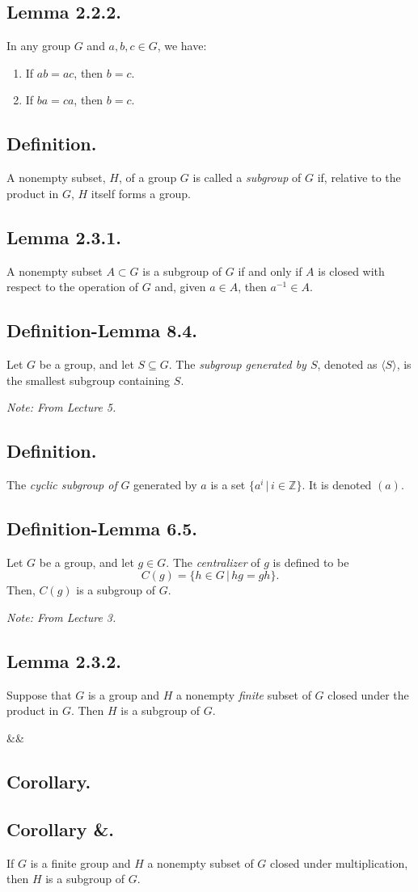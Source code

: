 \documentclass{article}
\newenvironment{lemma}[1]{\subsection*{Lemma #1.}}{}
\newenvironment{defn}{\subsection*{Definition.}}{}
\newenvironment{defnlemma}[1]{\subsection*{Definition-Lemma #1.}}{}
\newenvironment{corollary}[1]{
    \def\temp{#1}\def\null{&}\ifx\temp\null
        \subsection*{Corollary.}
    \else
        \subsection*{Corollary #1.}
    \fi
    
}{}
\newcommand*{\Z}{\mathbb{Z}}
\begin{document}
\begin{lemma}{2.2.2}
    In any group $G$ and $a, b, c \in G$, we have:
    \begin{enumerate}[label=(\alph*)]
        \item If $ab = ac$, then $b = c$.
        \item If $ba = ca$, then $b = c$.
    \end{enumerate}
\end{lemma}

\begin{defn}
    A nonempty subset, $H$, of a group $G$ is called a \textit{subgroup} of $G$ if,
    relative to the product in $G$, $H$ itself forms a group.
\end{defn}

\begin{lemma}{2.3.1}
    A nonempty subset $A \subset G$ is a subgroup of $G$ if and only if $A$ is closed 
    with respect to the operation of $G$ and, given $a \in A$, then $a^{-1} \in A$.
\end{lemma}

\begin{defnlemma}{8.4}
    Let $G$ be a group, and let $S \subseteq G$.
    The \textit{subgroup generated by $S$}, denoted as $\langle S \rangle $, is the smallest subgroup containing $S$.

    \textit{Note: From Lecture 5.}
\end{defnlemma}

\begin{defn}
    The \textit{cyclic subgroup of} $G$ generated by $a$ is a set $\{a^i \, | \, i \in \Z\}$.
    It is denoted $(a)$.
\end{defn}

\begin{defnlemma}{6.5}
    Let $G$ be a group, and let $g \in G$. The \textit{centralizer} of $g$ is defined to be
    \[
        C(g) = \{h \in G \, | \, hg = gh\}.  
    \]
    Then, $C(g)$ is a subgroup of $G$.

    \textit{Note: From Lecture 3.}
\end{defnlemma}

\begin{lemma}{2.3.2}
    Suppose that $G$ is a group and $H$ a nonempty \textit{finite} subset of $G$ closed under the product in $G$.
    Then $H$ is a subgroup of $G$.
\end{lemma}

\begin{corollary}{&}
    If $G$ is a finite group and $H$ a nonempty subset of $G$ closed under multiplication, then $H$ is a subgroup of $G$.
\end{corollary}
\end{document}
